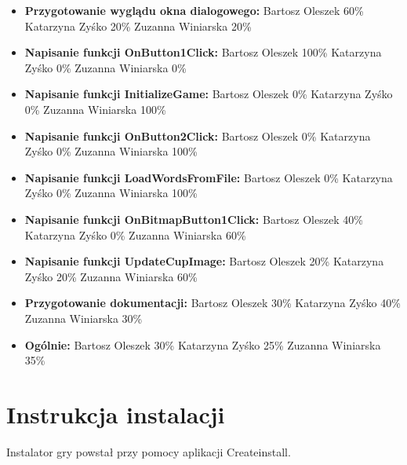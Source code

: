 \documentclass[]{report}
\begin{document}
	\begin{itemize}
		\item \textbf{Przygotowanie wyglądu okna dialogowego:}
		\subitem Bartosz Oleszek 60\%
		\subitem Katarzyna Zyśko 20\%
		\subitem Zuzanna Winiarska 20\%
		
		\item \textbf{Napisanie funkcji OnButton1Click:}
		\subitem Bartosz Oleszek 100\%
		\subitem Katarzyna Zyśko 0\%
		\subitem Zuzanna Winiarska 0\%
		
		\item \textbf{Napisanie funkcji InitializeGame:}
		\subitem Bartosz Oleszek 0\%
		\subitem Katarzyna Zyśko 0\%
		\subitem Zuzanna Winiarska 100\%
		
		\item \textbf{Napisanie funkcji OnButton2Click:}
		\subitem Bartosz Oleszek 0\%
		\subitem Katarzyna Zyśko 0\%
		\subitem Zuzanna Winiarska 100\%
		
		\item \textbf{Napisanie funkcji LoadWordsFromFile:}
		\subitem Bartosz Oleszek 0\%
		\subitem Katarzyna Zyśko 0\%
		\subitem Zuzanna Winiarska 100\%
		
		\item \textbf{Napisanie funkcji OnBitmapButton1Click:}
		\subitem Bartosz Oleszek 40\%
		\subitem Katarzyna Zyśko 0\%
		\subitem Zuzanna Winiarska 60\%
		
		\item \textbf{Napisanie funkcji UpdateCupImage:}
		\subitem Bartosz Oleszek 20\%
		\subitem Katarzyna Zyśko 20\%
		\subitem Zuzanna Winiarska 60\%
		
		\item \textbf{Przygotowanie dokumentacji:}
		\subitem Bartosz Oleszek 30\%
		\subitem Katarzyna Zyśko 40\%
		\subitem Zuzanna Winiarska 30\%
		
		\item \textbf{Ogólnie:}
		\subitem Bartosz Oleszek 30\%
		\subitem Katarzyna Zyśko 25\%
		\subitem Zuzanna Winiarska 35\%
	\end{itemize}
	
	\newpage
	
	\section*{Instrukcja instalacji}
	
	Instalator gry powstał przy pomocy aplikacji Createinstall. 
	
\end{document}
